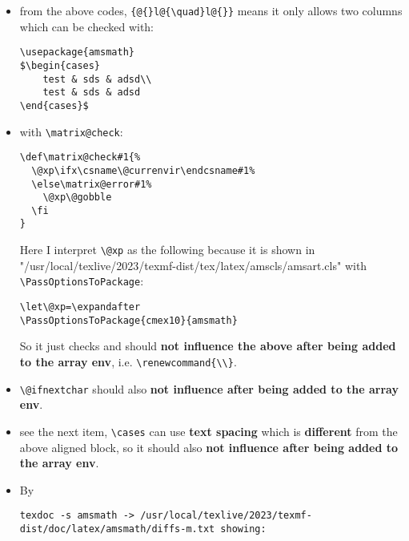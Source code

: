 \documentclass{article}
\begin{document}
\begin{enumerate}
          \begin{itemize}
              \item from the above codes, \verb|{@{}l@{\quad}l@{}}| means it only allows two columns which can be checked with:
                    \begin{verbatim}
\usepackage{amsmath}
$\begin{cases}
    test & sds & adsd\\
    test & sds & adsd
\end{cases}$
    \end{verbatim}
              \item with \verb|\matrix@check|:
                    \begin{verbatim}
\def\matrix@check#1{%
  \@xp\ifx\csname\@currenvir\endcsname#1%
  \else\matrix@error#1%
    \@xp\@gobble
  \fi
}
\end{verbatim}
                    Here I interpret \verb|\@xp| as the following because it is shown in "/usr/local/texlive/2023/texmf-dist/tex/latex/amscls/amsart.cls" with \verb|\PassOptionsToPackage|:
                    \begin{verbatim}
\let\@xp=\expandafter
\PassOptionsToPackage{cmex10}{amsmath}
\end{verbatim}
                    So it just checks and should  \textbf{not influence the above after being added to the array env}, i.e. \verb|\renewcommand{\\}|.
              \item \verb|\@ifnextchar| should also \textbf{not influence after being added to the array env}.
              \item see the next item, \verb|\cases| can use \textbf{text spacing} which is \textbf{different} from the above aligned block, so it should also \textbf{not influence after being added to the array env}.
                    \hfuzz=1000pt
              \item By
                    \begin{lstlisting}
texdoc -s amsmath -> /usr/local/texlive/2023/texmf-dist/doc/latex/amsmath/diffs-m.txt showing:

\end{lstlisting}
\end{itemize}
\end{enumerate}
\end{document}
